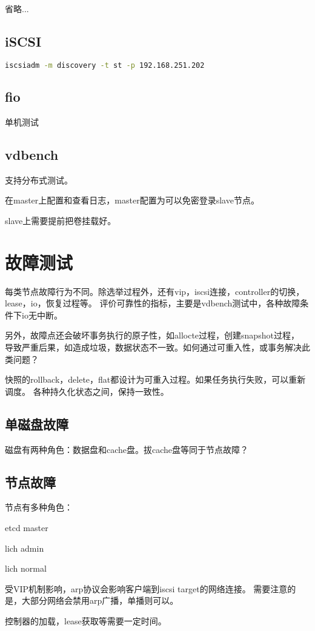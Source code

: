省略...

\subsection{iSCSI}

\begin{lstlisting}[language=bash]
iscsiadm -m discovery -t st -p 192.168.251.202
\end{lstlisting}

\subsection{fio}

单机测试

\subsection{vdbench}

支持分布式测试。

在master上配置和查看日志，master配置为可以免密登录slave节点。

slave上需要提前把卷挂载好。

\section{故障测试}

每类节点故障行为不同。除选举过程外，还有vip，iscsi连接，controller的切换，lease，io，恢复过程等。
评价可靠性的指标，主要是vdbench测试中，各种故障条件下io无中断。

另外，故障点还会破坏事务执行的原子性，如allocte过程，创建snapshot过程，
导致严重后果，如造成垃圾，数据状态不一致。如何通过可重入性，或事务解决此类问题？

快照的rollback，delete，flat都设计为可重入过程。如果任务执行失败，可以重新调度。
各种持久化状态之间，保持一致性。

\subsection{单磁盘故障}

磁盘有两种角色：数据盘和cache盘。拔cache盘等同于节点故障？

\subsection{节点故障}

节点有多种角色：
\begin{compactenum}
\item etcd master
\item lich admin
\item lich normal
\end{compactenum}

受VIP机制影响，arp协议会影响客户端到iscsi target的网络连接。
需要注意的是，大部分网络会禁用arp广播，单播则可以。

控制器的加载，lease获取等需要一定时间。
